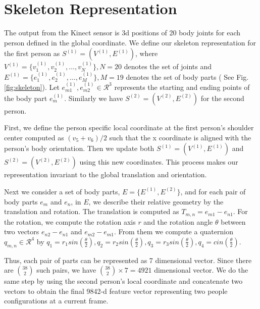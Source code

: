 \documentclass[10pt,twocolumn,letterpaper]{article}
\begin{document}
\section{Skeleton Representation}


The output from the Kinect sensor is 3d positions of 20 body joints for each person defined in the global coordinate. We define our skeleton representation for the first person as $S^{(1)}=(V^{(1)},E^{(1)})$, where $V^{(1)}=\{v_{1}^{(1)},v_{2}^{(1)},\dots,v_{N}^{(1)}\}, N=20$ denotes the set of joints and $E^{(1)}=\{e_{1}^{(1)},e_{2}^{(1)},\dots,e_{M}^{(1)}\}, M=19$ denotes the set of body parts ( See Fig.\ref{fig:skeleton}). Let $e_{m1}^{(1)},e_{m2}^{(1)} \in \mathcal{R}^3$ represents the starting and ending points of the body part $e_{m}^{(1)}$. Similarly we have $S^{(2)}=(V^{(2)},E^{(2)})$ for the second person.

First, we define the person specific local coordinate at the first person's shoulder center computed as $(v_5 + v_6)/2$ such that the x coordinate is aligned with the person's body orientation. Then we update both $S^{(1)}=(V^{(1)},E^{(1)})$ and $S^{(2)}=(V^{(2)},E^{(2)})$ using this new coordinates. This process makes our representation invariant to the global translation and orientation. 

Next we consider a set of body parts, $E=\{E^{(1)},E^{(2)}\}$, and for each pair of body parts $e_m$ and $e_n$, in $E$, we describe their relative geometry by the translation and rotation. The translation is computed as $T_{m,n}=e_{m1}-e_{n1}$. For the rotation, we compute the rotation axis $r$ and the rotation angle $\theta$ between two vectors $e_{n2}-e_{n1}$ and $e_{m2}-e_{m1}$. From them we compute a quaternion $q_{m,n} \in \mathcal{R}^4$ by $q_1=r_1 sin( \frac{\theta}{2} ), q_2=r_2 sin( \frac{\theta}{2} ), q_3=r_3 sin( \frac{\theta}{2}), q_4=cin( \frac{\theta}{2})$.

Thus, each pair of parts can be represented as 7 dimensional vector. Since there are $\binom{38}{2}$ such pairs, we have $\binom{38}{2} \times 7 = 4921$ dimensional vector. We do the same step by using the second person's local coordinate and concatenate two vectors to obtain the final 9842-d feature vector representing two people configurations at a current frame.
\end{document}

